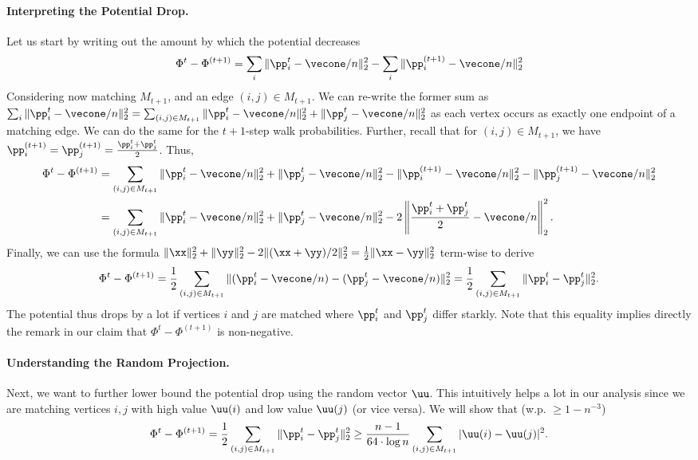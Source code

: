 \paragraph{Interpreting the Potential Drop.} Let us start by writing out the amount by which the potential decreases 
\begin{align*}
     \Phi^{t} - \Phi^{(t+1)} = \sum_{i} \|\pp_{i}^t -\vecone/n\|_2^2 - \sum_{i} \|\pp_{i}^{(t+1)} -\vecone/n\|_2^2
\end{align*}
Considering now matching $M_{t+1}$,  and an edge $(i,j) \in M_{t+1}$. We can re-write the former sum as $\sum_{i} \|\pp_{i}^t -\vecone/n\|_2^2 = \sum_{(i,j) \in M_{t+1}} \|\pp_{i}^t -\vecone/n\|_2^2 + \|\pp_{j}^t -\vecone/n\|_2^2$ as each vertex occurs as exactly one endpoint of a matching edge. We can do the same for the $t+1$-step walk probabilities. Further, recall that for $(i,j) \in M_{t+1}$, we have $\pp_i^{(t+1)} = \pp_j^{(t+1)} = \frac{\pp_i^t+ \pp_j^t}{2}$. Thus,
\begin{align*}
     \Phi^{t} - \Phi^{(t+1)} &= \sum_{(i,j) \in M_{t+1}}  \|\pp_{i}^t -\vecone/n\|_2^2 + \|\pp_{j}^t -\vecone/n\|_2^2 -  \|\pp_{i}^{(t+1)} -\vecone/n\|_2^2 - \|\pp_{j}^{(t+1)} -\vecone/n\|_2^2\\
     &= \sum_{(i,j)\in M_{t+1}}  \|\pp_{i}^t -\vecone/n\|_2^2 + \|\pp_{j}^t -\vecone/n\|_2^2 - 2 \left\|\frac{\pp_i^t+ \pp_j^t}{2} - \vecone/n \right\|_2^2.
\end{align*}
Finally, we can use the formula $\|\xx\|_2^2 + \|\yy\|_2^2 - 2 \|(\xx + \yy)/2\|_2^2 = \frac{1}{2} \| \xx - \yy\|_2^2$ term-wise to derive 
\begin{align*}
     \Phi^{t} - \Phi^{(t+1)} = \frac{1}{2}\sum_{(i,j) \in M_{t+1}} \|(\pp_{i}^t -\vecone/n) - (\pp_{j}^t -\vecone/n)\|_2^2 = \frac{1}{2}\sum_{(i,j) \in M_{t+1}} \|\pp_{i}^t - \pp_{j}^t \|_2^2.
\end{align*}
The potential thus drops by a lot if vertices $i$ and $j$ are matched where $\pp_{i}^t$ and $\pp_{j}^t$ differ starkly. Note that this equality implies directly the remark in our claim that $\Phi^t - \Phi^{(t+1)}$ is non-negative.

\paragraph{Understanding the Random Projection.} Next, we want to further lower bound the potential drop using the random vector $\uu$. This intuitively helps a lot in our analysis since we are matching vertices $i,j$ with high value $\uu(i)$ and low value $\uu(j)$ (or vice versa). We will show that (w.p. $\geq 1-n^{-3}$)
\begin{align}\label{eq:cutMatchingAnalysis}
     \Phi^{t} - \Phi^{(t+1)} = \frac{1}{2} \sum_{(i,j) \in M_{t+1}} \|\pp_{i}^t - \pp_{j}^t \|_2^2 \geq \frac{n-1}{64 \cdot \log n} \sum_{(i,j) \in M_{t+1}} |\uu(i) - \uu(j)|^2.
\end{align}

